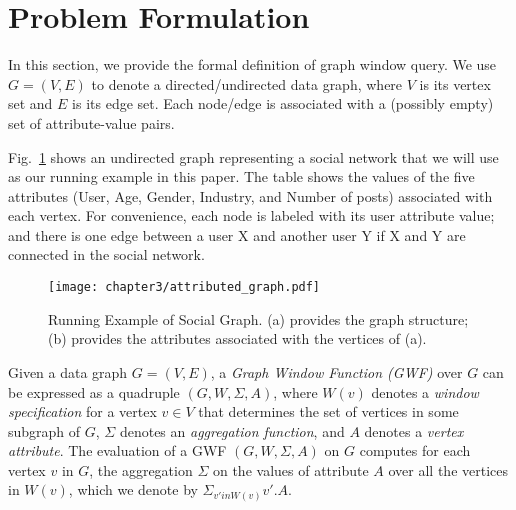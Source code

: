 \section{Problem Formulation}


In this section, we provide the formal definition of graph window query.
We use $G = (V,E)$ to denote a directed/undirected data graph, where $V$ is its vertex set and $E$ is its edge set.
Each node/edge is associated with a (possibly empty) set of attribute-value pairs.


Fig.~\ref{fig:attributed} shows an undirected graph representing a social network that we will use as our running example in this paper. 
The table shows the values of the five attributes (User, Age, Gender, Industry, and Number of posts) associated with each vertex. For convenience, each node is labeled with its user attribute value;
and there is one edge between a user X and another user Y if X and Y are connected in the social network.


\begin{figure}[t]
\centering
\texttt{[image: chapter3/attributed\_graph.pdf]}
	\caption{Running Example of Social Graph. (a) provides the graph structure; (b) provides the attributes associated with the vertices of (a).} 
	\label{fig:attributed}
\end{figure}

Given a data graph $G = (V,E)$,
a \emph{Graph Window Function (GWF)} over $G$ can be expressed 
as a quadruple $(G, W, \Sigma, A)$, where 
$W(v)$ denotes a \emph{window specification} for a vertex $v \in V$ 
that determines the set of vertices in some subgraph of $G$,
$\Sigma$ denotes an \emph{aggregation function}, and $A$ denotes 
a \emph{vertex attribute}.
The evaluation of a GWF $(G, W, \Sigma, A)$ on $G$
computes for each vertex $v$ in $G$, the aggregation $\Sigma$ on the 
values of attribute $A$  
over all the vertices in $W(v)$, which we denote by $\Sigma_{v' in W(v)} v'.A$.

